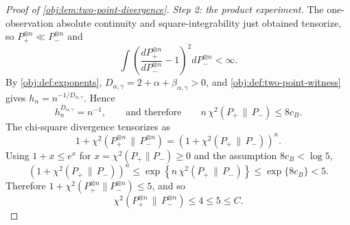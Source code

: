 \documentclass[11pt]{article}
\begin{document}
\begin{proof}[Proof of \cref{obj:lem:two-point-divergence}]
\emph{Step 2: the product experiment.}  The one-observation absolute continuity and square-integrability just obtained tensorize, so \(P_+^{\otimes n}\ll P_-^{\otimes n}\) and
\[
\int \left(\frac{dP_+^{\otimes n}}{dP_-^{\otimes n}}-1\right)^2 dP_-^{\otimes n}<\infty .
\]
By \cref{obj:def:exponents}, \(D_{\alpha,\gamma}=2+\alpha+\beta_{\alpha,\gamma}>0\), and \cref{obj:def:two-point-witness} gives \(h_n=n^{-1/D_{\alpha,\gamma}}\).  Hence
\[
h_n^{D_{\alpha,\gamma}}=n^{-1},
\qquad\text{and therefore}\qquad
n\,\chi^2(P_+\,\|\,P_-)
\le 8c_B .
\]
The chi-square divergence tensorizes as
\[
1+\chi^2(P_+^{\otimes n}\,\|\,P_-^{\otimes n})
 =
 \left(1+\chi^2(P_+\,\|\,P_-)\right)^n .
\]
Using \(1+x\le e^x\) for \(x=\chi^2(P_+\|P_-)\ge0\) and the assumption \(8c_B<\log5\),
\[
\left(1+\chi^2(P_+\,\|\,P_-)\right)^n
 \le \exp\left\{n\,\chi^2(P_+\,\|\,P_-)\right\}
 \le \exp\{8c_B\}
 < 5 .
\]
Therefore \(1+\chi^2(P_+^{\otimes n}\|P_-^{\otimes n})\le5\), and so
\[
\chi^2(P_+^{\otimes n}\,\|\,P_-^{\otimes n})\le4\le 5\le C .
\]
\end{proof}
\end{document}
